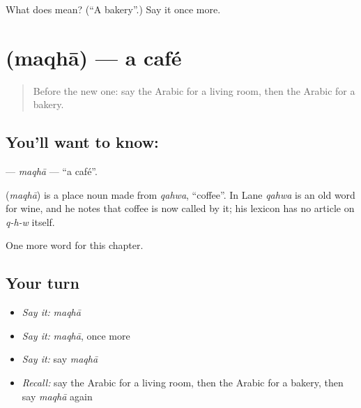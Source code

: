 \begin{tcolorbox}[breakable,colback=teal!4,colframe=teal!35!black,title={Before you move on}]
What does  mean? (\textquotedblleft{}A bakery\textquotedblright{}.) Say it once more.
\end{tcolorbox}
\section[\texorpdfstring{\ar{مقهى} (maqhā)}{مقهى (maqhā)}]{ (maqhā) — a café}

\label{lesson:AR-C172-maqha}



\begin{quote}
Before the new one: say the Arabic for a living room, then the Arabic for a bakery.
\end{quote}

\subsection*{You'll want to know: }
\textbf{} — \emph{maqhā} — \textquotedblleft{}a café\textquotedblright{}.

\begin{cousinweb}
\textbf{} (\emph{maqhā}) is a place noun made from \emph{qahwa}, \textquotedblleft{}coffee\textquotedblright{}. In Lane \emph{qahwa} is an old word for wine, and he notes that coffee is now called by it; his lexicon has no article on \emph{q-h-w} itself.
\end{cousinweb}

\begin{grammarlens}[title={What you've built}]
One more word for this chapter.
\end{grammarlens}

\subsection*{Your turn}
\begin{itemize}
\raggedright
  \item \emph{Say it:} \emph{maqhā}
  \item \emph{Say it:} \emph{maqhā}, once more
  \item \emph{Say it:} say \emph{maqhā}
  \item \emph{Recall:} say the Arabic for a living room, then the Arabic for a bakery, then say \emph{maqhā} again
\end{itemize}

